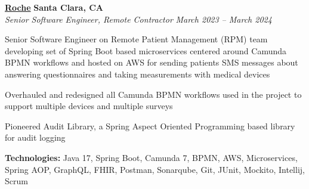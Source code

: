 %
    \headerrow
        {\textbf{\href{https://www.roche.com/}{Roche}}}
        {\textbf{Santa Clara, CA}}
    \\
    \headerrow
        {\emph{Senior Software Engineer, Remote Contractor}}
        {\emph{March 2023 -- March 2024}}
    \begin{itemize*}
        \item Senior Software Engineer on Remote Patient Management (RPM) team developing set of Spring Boot based microservices centered around Camunda BPMN workflows and hosted on AWS for sending patients SMS messages about answering questionnaires and taking measurements with medical devices
        \item Overhauled and redesigned all Camunda BPMN workflows used in the project to support multiple devices and multiple surveys
        \item Pioneered Audit Library, a Spring Aspect Oriented Programming based library for audit logging
    \end{itemize*}

    \hspace{1.0em}
        {\textbf{Technologies:} Java 17, Spring Boot, Camunda 7, BPMN, AWS, Microservices, Spring AOP, GraphQL, FHIR, Postman, Sonarqube, Git, JUnit, Mockito, Intellij, Scrum}

